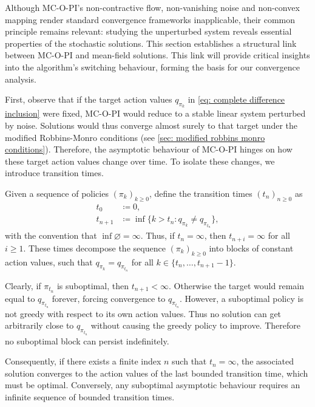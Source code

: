 Although MC-O-PI's non-contractive flow, non-vanishing noise and non-convex mapping render standard convergence frameworks inapplicable,
their common principle remains relevant: studying the unperturbed system reveals essential properties of the stochastic solutions.
This section establishes a structural link between MC-O-PI and mean-field solutions. This link will provide critical insights into the algorithm's switching behaviour, forming the basis for our convergence analysis.

First, observe that if the target action values $q_{\pi_k}$ in \eqref{eq: complete difference inclusion} were fixed, MC-O-PI would reduce to a stable linear system perturbed by noise.
Solutions would thus converge almost surely to that target under the modified Robbins-Monro conditions (see \autoref{sec: modified robbins monro conditions}).
Therefore, the asymptotic behaviour of MC-O-PI hinges on how these target action values change over time.
To isolate these changes, we introduce transition times.

\begin{definition}
\label{def: transition times}
Given a sequence of policies $(\pi_k)_{k \ge 0}$,
define the transition times $(t_n)_{n \ge 0}$ as
\begin{align*}
t_0 &\coloneqq 0 ,
\\
t_{n+1} &\coloneqq \inf\{k>t_n : q_{\pi_k} \neq q_{\pi_{t_n}} \},
\end{align*}
with the convention that $\inf \varnothing = \infty$.
Thus, if $t_n = \infty$, then $t_{n+i} = \infty$ for all $i \ge 1$.
These times decompose the sequence $(\pi_k)_{k \ge 0}$ into blocks of constant action values, such that $q_{\pi_k} = q_{\pi_{t_n}}$ for all $k \in \{t_n, \dots, t_{n+1}-1 \}$.
\end{definition}

\vspace{-0.6cm}

Clearly, if $\pi_{t_n}$ is suboptimal, then $t_{n+1}<\infty$.
Otherwise the target would remain equal to \(q_{\pi_{t_n}}\) forever, forcing convergence to \(q_{\pi_{t_n}}\).
However, a suboptimal policy is not greedy with respect to its own action values.
Thus no solution can get arbitrarily close to $q_{\pi_{t_n}}$ without causing the greedy policy to improve. Therefore no suboptimal block can persist indefinitely.

Consequently, if there exists a finite index $n$ such that $t_{n} = \infty$, the associated solution converges to the action values of the last bounded transition time, which must be optimal.
Conversely, any suboptimal asymptotic behaviour requires an infinite sequence of bounded transition times.


